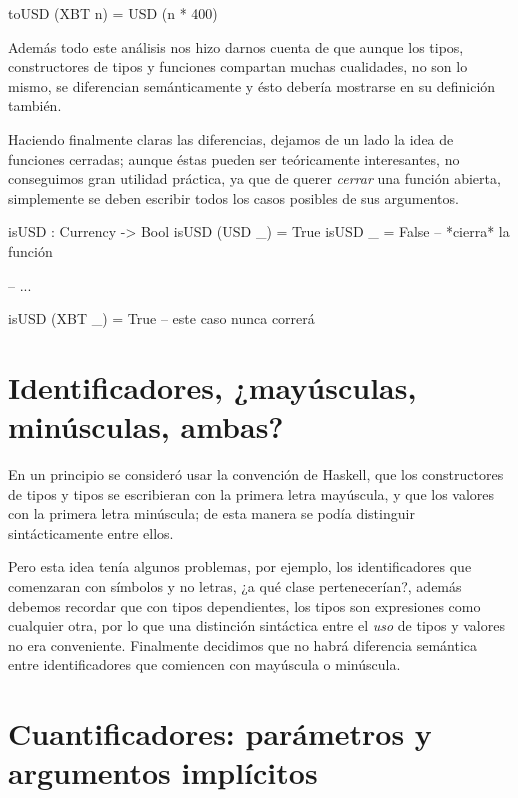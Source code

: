 {\begin{designfr}
\begin{anglercode}
toUSD (XBT n) = USD (n * 400)
\end{anglercode}

Además todo este análisis nos hizo darnos cuenta de que aunque los tipos, constructores de tipos y funciones compartan muchas cualidades, no son lo mismo, se diferencian semánticamente y ésto debería mostrarse en su definición también.

Haciendo finalmente claras las diferencias, dejamos de un lado la idea de funciones cerradas; aunque éstas pueden ser teóricamente interesantes, no conseguimos gran utilidad práctica, ya que de querer \textit{cerrar} una función abierta, simplemente se deben escribir todos los casos posibles de sus argumentos.

\begin{anglercode}
isUSD : Currency -> Bool
isUSD (USD _) = True
isUSD _ = False         -- *cierra* la función

-- ...

isUSD (XBT _) = True    -- este caso nunca correrá
\end{anglercode}
\end{designfr}

\section{Identificadores, ¿mayúsculas, minúsculas, ambas?}

\begin{designfr}
En un principio se consideró usar la convención de Haskell, que los constructores de tipos y tipos se escribieran con la primera letra mayúscula, y que los valores con la primera letra minúscula; de esta manera se podía distinguir sintácticamente entre ellos.

Pero esta idea tenía algunos problemas, por ejemplo, los identificadores que comenzaran con símbolos y no letras, ¿a qué clase pertenecerían?, además debemos recordar que con tipos dependientes, los tipos son expresiones como cualquier otra, por lo que una distinción sintáctica entre el \emph{uso} de tipos y valores no era conveniente. Finalmente decidimos que no habrá diferencia semántica entre identificadores que comiencen con mayúscula o minúscula.
\end{designfr}

\section{Cuantificadores: parámetros y argumentos implícitos}

}
